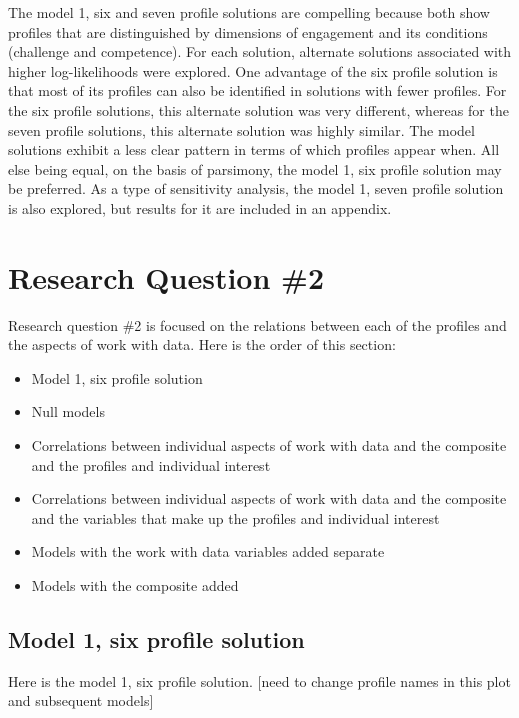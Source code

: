 \documentclass[]{book}
\providecommand{\tightlist}{%
  \setlength{\itemsep}{0pt}\setlength{\parskip}{0pt}}
\theoremstyle{definition}
\theoremstyle{definition}
\theoremstyle{definition}
\theoremstyle{remark}
\begin{document}
The model 1, six and seven profile solutions are compelling because both
show profiles that are distinguished by dimensions of engagement and its
conditions (challenge and competence). For each solution, alternate
solutions associated with higher log-likelihoods were explored. One
advantage of the six profile solution is that most of its profiles can
also be identified in solutions with fewer profiles. For the six profile
solutions, this alternate solution was very different, whereas for the
seven profile solutions, this alternate solution was highly similar. The
model solutions exhibit a less clear pattern in terms of which profiles
appear when. All else being equal, on the basis of parsimony, the model
1, six profile solution may be preferred. As a type of sensitivity
analysis, the model 1, seven profile solution is also explored, but
results for it are included in an appendix.

\section{Research Question \#2}\label{research-question-2}

Research question \#2 is focused on the relations between each of the
profiles and the aspects of work with data. Here is the order of this
section:

\begin{itemize}
\tightlist
\item
  Model 1, six profile solution
\item
  Null models
\item
  Correlations between individual aspects of work with data and the
  composite and the profiles and individual interest
\item
  Correlations between individual aspects of work with data and the
  composite and the variables that make up the profiles and individual
  interest
\item
  Models with the work with data variables added separate
\item
  Models with the composite added
\end{itemize}

\subsection{Model 1, six profile
solution}\label{model-1-six-profile-solution}

Here is the model 1, six profile solution. {[}need to change profile
names in this plot and subsequent models{]}
\end{document}
